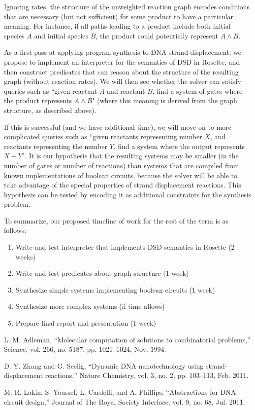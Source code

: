 \documentclass{article}
\begin{document}
Ignoring rates, the structure of the unweighted reaction graph encodes
conditions that are necessary (but not sufficient) for some product to have a
particular meaning. For instance, if all paths leading to a product include both
initial species $A$ and initial species $B$, the product could potentially
represent $A \land B$.

As a first pass at applying program synthesis to DNA strand displacement, we
propose to implement an interpreter for the semantics of DSD in Rosette, and
then construct predicates that can reason about the structure of the resulting
graph (without reaction rates). We will then see whether the solver can satisfy
queries such as ``given reactant $A$ and reactant $B$, find a system of gates
where the product represents $A \land B$" (where this meaning is derived from
the graph structure, as described above).

If this is successful (and we have additional time), we will move on to more
complicated queries such as ``given reactants representing number $X$, and
reactants representing the number $Y$, find a system where the output represents
$X + Y$".  It is our hypothesis that the resulting systems may be smaller (in
the number of gates or number of reactions) than systems that are compiled from
known implementations of boolean circuits, because the solver will be able
to take advantage of the special properties of strand displacement reactions.
This hypothesis can be tested by
encoding it as additional constraints for the synthesis problem.

To summarize, our proposed timeline of work for the rest of the term is as
follows:
\begin{enumerate}
\item
Write and test interpreter that implements DSD semantics in Rosette (2
weeks)

\item
Write and test predicates about graph structure (1 week)

\item
Synthesize simple systems implementing boolean circuits (1 week)

\item
Synthesize more complex systems (if time allows)

\item
Prepare final report and presentation (1 week)
\end{enumerate}

\begin{thebibliography}{9}

L. M. Adleman,
“Molecular computation of solutions to combinatorial problems,”
Science, vol. 266, no. 5187, pp. 1021–1024, Nov. 1994.

D. Y. Zhang and G. Seelig,
“Dynamic DNA nanotechnology using strand-displacement reactions,”
Nature Chemistry, vol. 3, no. 2, pp. 103–113, Feb. 2011.

M. R. Lakin, S. Youssef, L. Cardelli, and A. Phillips,
“Abstractions for DNA circuit design,”
Journal of The Royal Society Interface, vol. 9, no. 68, Jul. 2011.

\end{thebibliography}
\end{document}
